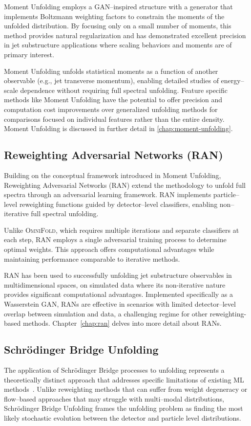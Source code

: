     Moment Unfolding employs a GAN--inspired structure with a generator that implements Boltzmann weighting factors to constrain the moments of the unfolded distribution.
    By focusing only on a small number of moments, this method provides natural regularization and has demonstrated excellent precision in jet substructure applications where scaling behaviors and moments are of primary interest.

    Moment Unfolding unfolds statistical moments as a function of another observable (e.g., jet transverse momentum), enabling detailed studies of energy--scale dependence without requiring full spectral unfolding.
    Feature specific methods like Moment Unfolding have the potential to offer precision and computation cost improvements over generalized unfolding methods for comparisons focused on individual features rather than the entire density.
    Moment Unfolding is discussed in further detail in \cref{chap:moment-unfolding}.

\subsection{Reweighting Adversarial Networks (RAN)}

    Building on the conceptual framework introduced in Moment Unfolding, Reweighting Adversarial Networks (RAN) extend the methodology to unfold full spectra through an adversarial learning framework.
    RAN implements particle--level reweighting functions guided by detector--level classifiers, enabling non--iterative full spectral unfolding.

    Unlike \textsc{OmniFold}, which requires multiple iterations and separate classifiers at each step, RAN employs a single adversarial training process to determine optimal weights.
    This approach offers computational advantages while maintaining performance comparable to iterative methods.

    RAN has been used to successfully unfolding jet substructure observables in multidimensional spaces, on simulated data where its non-iterative nature provides significant computational advantages.
    Implemented specifically as a Wasserstein GAN, RANs are effective in scenarios with limited detector--level overlap between simulation and data, a challenging regime for other reweighting-based methods.
    Chapter~\ref{chap:ran} delves into more detail about RANs.

\subsection{Schr\"odinger Bridge Unfolding}
    The application of Schr\"odinger Bridge processes to unfolding represents a theoretically distinct approach that addresses specific limitations of existing ML methods~\cite{Vargas2021SolvingBridges,Diefenbacher:2023wec}.
    Unlike reweighting methods that can suffer from weight degeneracy or flow--based approaches that may struggle with multi--modal distributions, Schr\"odinger Bridge Unfolding frames the unfolding problem as finding the most likely stochastic evolution between the detector and particle level distributions.

